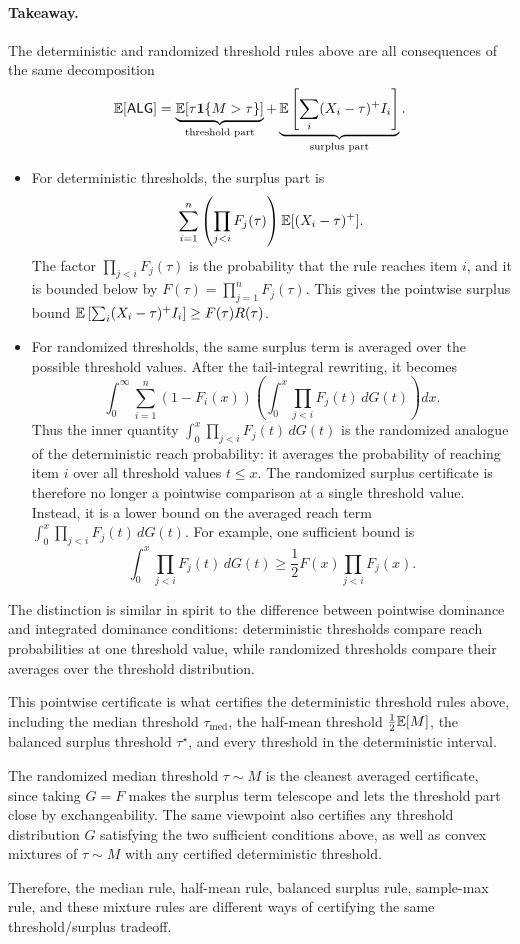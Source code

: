 \paragraph{Takeaway.}
The deterministic and randomized threshold rules above are all consequences of the same decomposition
\[
\mathbb{E}[\mathsf{ALG}]
=
\underbrace{\mathbb{E}[\tau\mathbf{1}\{M>\tau\}]}_{\text{threshold part}}
+
\underbrace{\mathbb{E}\left[\sum_i (X_i-\tau)^+I_i\right]}_{\text{surplus part}}.
\]

\begin{itemize}
\item For deterministic thresholds, the surplus part is
\[
\sum_{i=1}^n
\left(\prod_{j<i}F_j(\tau)\right)
\mathbb{E}[(X_i-\tau)^+].
\]
The factor $\prod_{j<i}F_j(\tau)$ is the probability that the rule reaches item $i$, and it is bounded below by $F(\tau)=\prod_{j=1}^n F_j(\tau)$. This gives the pointwise surplus bound $\mathbb{E}\left[\sum_i (X_i-\tau)^+I_i\right]\ge F(\tau)R(\tau)$.

\item For randomized thresholds, the same surplus term is averaged over the possible threshold values. After the tail-integral rewriting, it becomes
\[
\int_0^\infty
\sum_{i=1}^n (1-F_i(x))
\left(
\int_0^x \prod_{j<i}F_j(t)\,dG(t)
\right)dx.
\]
Thus the inner quantity $\int_0^x \prod_{j<i}F_j(t)\,dG(t)$ is the randomized analogue of the deterministic reach probability: it averages the probability of reaching item $i$ over all threshold values $t\le x$. The randomized surplus certificate is therefore no longer a pointwise comparison at a single threshold value. Instead, it is a lower bound on the averaged reach term $\int_0^x \prod_{j<i}F_j(t)\,dG(t)$.
For example, one sufficient bound is
\[
\int_0^x \prod_{j<i}F_j(t)\,dG(t)
\ge
\frac12 F(x)\prod_{j<i}F_j(x).
\]
\end{itemize}

The distinction is similar in spirit to the difference between pointwise dominance and integrated dominance conditions: deterministic thresholds compare reach probabilities at one threshold value, while randomized thresholds compare their averages over the threshold distribution.

This pointwise certificate is what certifies the deterministic threshold rules above, including the median threshold $\tau_{\mathrm{med}}$, the half-mean threshold $\frac12\mathbb{E}[M]$, the balanced surplus threshold $\tau^\star$, and every threshold in the deterministic interval.

The randomized median threshold $\tau\sim M$ is the cleanest averaged certificate, since taking $G=F$ makes the surplus term telescope and lets the threshold part close by exchangeability. The same viewpoint also certifies any threshold distribution $G$ satisfying the two sufficient conditions above, as well as convex mixtures of $\tau\sim M$ with any certified deterministic threshold.


Therefore, the median rule, half-mean rule, balanced surplus rule, sample-max rule, and these mixture rules are different ways of certifying the same threshold/surplus tradeoff.

{


}


